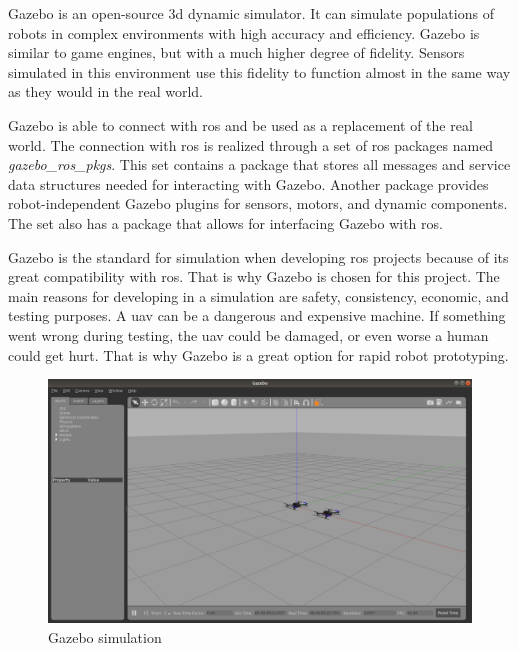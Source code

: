 Gazebo is an open-source \acs{3d} dynamic simulator. It can simulate populations of robots in complex environments with high accuracy and efficiency. Gazebo is similar to game engines, but with a much higher degree of fidelity. Sensors simulated in this environment use this fidelity to function almost in the same way as they would in the real world. \cite{gazebo_beginner_overview} \cite{ackerman2016gazebo}

Gazebo is able to connect with \acs{ros} and be used as a replacement of the real world. The connection with \acs{ros} is realized through a set of \acs{ros} packages named \textit{gazebo\_ros\_pkgs}.
This set contains a package that stores all messages and service data structures needed for interacting with Gazebo. Another package provides robot\hyp{}independent Gazebo plugins for sensors, motors, and dynamic components. The set also has a package that allows for interfacing Gazebo with \acs{ros}. \cite{gazebo_ros_overview} \cite{gazebo_ros_control}

Gazebo is the standard for simulation when developing \acs{ros} projects because of its great compatibility with \acs{ros}. That is why Gazebo is chosen for this project. The main reasons for developing in a simulation are safety, consistency, economic, and testing purposes. A \acs{uav} can be a dangerous and expensive machine. If something went wrong during testing, the \acs{uav} could be damaged, or even worse a human could get hurt. That is why Gazebo is a great option for rapid robot prototyping.

\begin{figure}[!h]
  \centering
  \includegraphics[width=\linewidth]{images/gazebo.png}
  \caption{Gazebo simulation}
\end{figure}